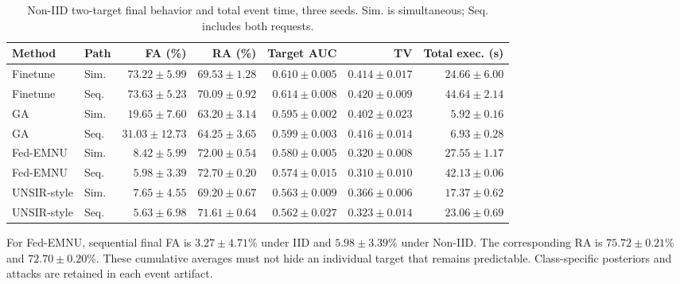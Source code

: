 \documentclass[software,article,submit,moreauthors]{Definitions/mdpi}
\begin{document}
\begin{table}[H]\centering\footnotesize\setlength{\tabcolsep}{3pt}

\caption{Non-IID two-target final behavior and total event time, three seeds. Sim. is simultaneous; Seq. includes both requests.}

\label{tab:sequence-noniid}

\begin{tabular}{llrrrrr}\toprule Method & Path & FA (\%) & RA (\%) & Target AUC & TV & Total exec. (s)\\\midrule

Finetune & Sim. & $73.22 \pm 5.99$ & $69.53 \pm 1.28$ & $0.610 \pm 0.005$ & $0.414 \pm 0.017$ & $24.66 \pm 6.00$\\

Finetune & Seq. & $73.63 \pm 5.23$ & $70.09 \pm 0.92$ & $0.614 \pm 0.008$ & $0.420 \pm 0.009$ & $44.64 \pm 2.14$\\

GA & Sim. & $19.65 \pm 7.60$ & $63.20 \pm 3.14$ & $0.595 \pm 0.002$ & $0.402 \pm 0.023$ & $5.92 \pm 0.16$\\

GA & Seq. & $31.03 \pm 12.73$ & $64.25 \pm 3.65$ & $0.599 \pm 0.003$ & $0.416 \pm 0.014$ & $6.93 \pm 0.28$\\

Fed-EMNU & Sim. & $8.42 \pm 5.99$ & $72.00 \pm 0.54$ & $0.580 \pm 0.005$ & $0.320 \pm 0.008$ & $27.55 \pm 1.17$\\

Fed-EMNU & Seq. & $5.98 \pm 3.39$ & $72.70 \pm 0.20$ & $0.574 \pm 0.015$ & $0.310 \pm 0.010$ & $42.13 \pm 0.06$\\

UNSIR-style & Sim. & $7.65 \pm 4.55$ & $69.20 \pm 0.67$ & $0.563 \pm 0.009$ & $0.366 \pm 0.006$ & $17.37 \pm 0.62$\\

UNSIR-style & Seq. & $5.63 \pm 6.98$ & $71.61 \pm 0.64$ & $0.562 \pm 0.027$ & $0.323 \pm 0.014$ & $23.06 \pm 0.69$\\

\bottomrule\end{tabular}\end{table}

For Fed-EMNU, sequential final FA is $3.27 \pm 4.71$\% under IID and $5.98 \pm 3.39$\% under Non-IID. The corresponding RA is $75.72 \pm 0.21$\% and $72.70 \pm 0.20$\%. These cumulative averages must not hide an individual target that remains predictable. Class-specific posteriors and attacks are retained in each event artifact.
\end{document}
